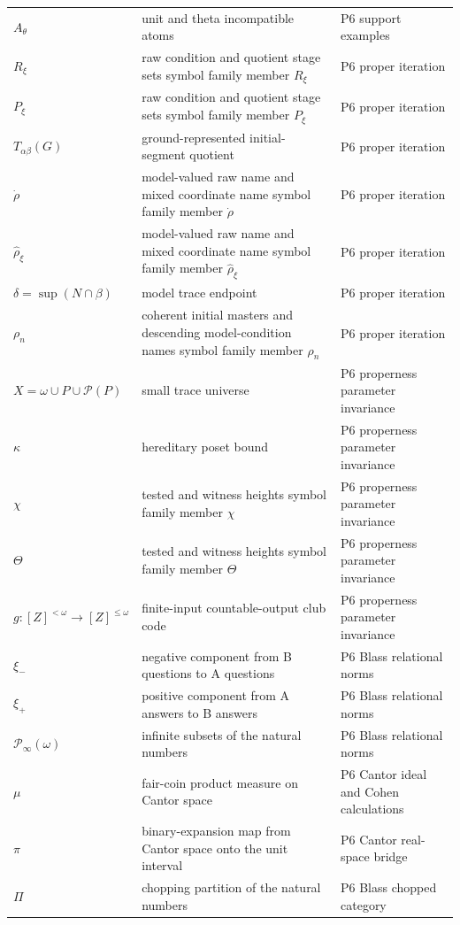 \begin{longtable}{@{}p{}p{}p{}@{}}
\(A_\theta\) & unit and theta incompatible atoms & P6 support examples \\
\(R_\xi\) & raw condition and quotient stage sets symbol family member \(R_\xi\) & P6 proper iteration \\
\(P_\xi\) & raw condition and quotient stage sets symbol family member \(P_\xi\) & P6 proper iteration \\
\(T_{\alpha\beta}(G)\) & ground-represented initial-segment quotient & P6 proper iteration \\
\(\dot\rho\) & model-valued raw name and mixed coordinate name symbol family member \(\dot\rho\) & P6 proper iteration \\
\(\widehat\rho_\xi\) & model-valued raw name and mixed coordinate name symbol family member \(\widehat\rho_\xi\) & P6 proper iteration \\
\(\delta=\sup(N\cap\beta)\) & model trace endpoint & P6 proper iteration \\
\(\rho_n\) & coherent initial masters and descending model-condition names symbol family member \(\rho_n\) & P6 proper iteration \\
\(X=\omega\cup P\cup\mathcal P(P)\) & small trace universe & P6 properness parameter invariance \\
\(\kappa\) & hereditary poset bound & P6 properness parameter invariance \\
\(\chi\) & tested and witness heights symbol family member \(\chi\) & P6 properness parameter invariance \\
\(\Theta\) & tested and witness heights symbol family member \(\Theta\) & P6 properness parameter invariance \\
\(g:[Z]^{<\omega}\to[Z]^{\leq\omega}\) & finite-input countable-output club code & P6 properness parameter invariance \\
\(\xi_-\) & negative component from B questions to A questions & P6 Blass relational norms \\
\(\xi_+\) & positive component from A answers to B answers & P6 Blass relational norms \\
\(\mathcal P_\infty(\omega)\) & infinite subsets of the natural numbers & P6 Blass relational norms \\
\(\mu\) & fair-coin product measure on Cantor space & P6 Cantor ideal and Cohen calculations \\
\(\pi\) & binary-expansion map from Cantor space onto the unit interval & P6 Cantor real-\allowbreak{}space bridge \\
\(\Pi\) & chopping partition of the natural numbers & P6 Blass chopped category \\

\end{longtable}
